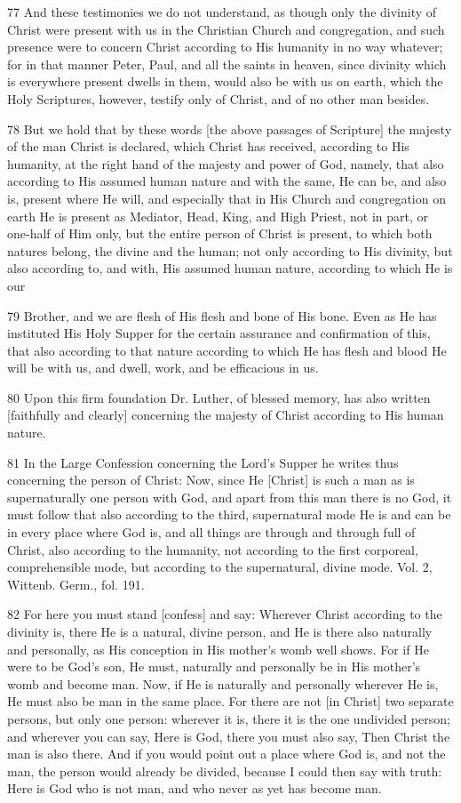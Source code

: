 {77 And these testimonies we do not understand, as though only the divinity of Christ were present with us in the Christian Church and congregation, and such presence were to concern Christ according to His humanity in no way whatever; for in that manner Peter, Paul, and all the saints in heaven, since divinity which is everywhere present dwells in them, would also be with us on earth, which the Holy Scriptures, however, testify only of Christ, and of no other man besides.

78 But we hold that by these words [the above passages of Scripture] the majesty of the man Christ is declared, which Christ has received, according to His humanity, at the right hand of the majesty and power of God, namely, that also according to His assumed human nature and with the same, He can be, and also is, present where He will, and especially that in His Church and congregation on earth He is present as Mediator, Head, King, and High Priest, not in part, or one-half of Him only, but the entire person of Christ is present, to which both natures belong, the divine and the human; not only according to His divinity, but also according to, and with, His assumed human nature, according to which He is our

79 Brother, and we are flesh of His flesh and bone of His bone. Even as He has instituted His Holy Supper for the certain assurance and confirmation of this, that also according to that nature according to which He has flesh and blood He will be with us, and dwell, work, and be efficacious in us.

80 Upon this firm foundation Dr. Luther, of blessed memory, has also written [faithfully and clearly] concerning the majesty of Christ according to His human nature.

81 In the Large Confession concerning the Lord’s Supper he writes thus concerning the person of Christ: Now, since He [Christ] is such a man as is supernaturally one person with God, and apart from this man there is no God, it must follow that also according to the third, supernatural mode He is and can be in every place where God is, and all things are through and through full of Christ, also according to the humanity, not according to the first corporeal, comprehensible mode, but according to the supernatural, divine mode. Vol. 2, Wittenb. Germ., fol. 191.

82 For here you must stand [confess] and say: Wherever Christ according to the divinity is, there He is a natural, divine person, and He is there also naturally and personally, as His conception in His mother’s womb well shows. For if He were to be God’s son, He must, naturally and personally be in His mother’s womb and become man. Now, if He is naturally and personally wherever He is, He must also be man in the same place. For there are not [in Christ] two separate persons, but only one person: wherever it is, there it is the one undivided person; and wherever you can say, Here is God, there you must also say, Then Christ the man is also there. And if you would point out a place where God is, and not the man, the person would already be divided, because I could then say with truth: Here is God who is not man, and who never as yet has become man.

}
